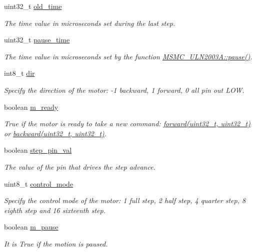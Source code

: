 \begin{DoxyCompactItemize}
uint32\+\_\+t \hyperlink{class_m_s_m_c___a4988_a60ff02342382a71526d14fb9e51ddc2a}{old\+\_\+time}
\begin{DoxyCompactList}\small\item\em The time value in microseconds set during the last step. \end{DoxyCompactList}\item 
uint32\+\_\+t \hyperlink{class_m_s_m_c___a4988_a3c4854c40c6d9db5e37698eea2debd70}{pause\+\_\+time}
\begin{DoxyCompactList}\small\item\em The time value in microseconds set by the function \hyperlink{class_m_s_m_c___u_l_n2003_a_aa1d3444465d59ca6c87f05f565dde4a2}{M\+S\+M\+C\+\_\+\+U\+L\+N2003\+A\+::pause()}. \end{DoxyCompactList}\item 
int8\+\_\+t \hyperlink{class_m_s_m_c___a4988_a887a3d29966bdfc0d920d339b83e5346}{dir}
\begin{DoxyCompactList}\small\item\em Specify the direction of the motor\+: -\/1 backward, 1 forward, 0 all pin out L\+O\+W. \end{DoxyCompactList}\item 
boolean \hyperlink{class_m_s_m_c___a4988_a86ef4c886ee6c7ed6fa87e27c0a7a9ea}{m\+\_\+ready}
\begin{DoxyCompactList}\small\item\em True if the motor is ready to take a new command\+: \hyperlink{class_m_s_m_c___a4988_a9acdbabf546656a6436e89579e8fcfca}{forward(uint32\+\_\+t, uint32\+\_\+t)} or \hyperlink{class_m_s_m_c___a4988_a836bed9e28e723ead2a94446bb704869}{backward(uint32\+\_\+t, uint32\+\_\+t)}. \end{DoxyCompactList}\item 
boolean \hyperlink{class_m_s_m_c___a4988_a1ec86b6286b8827eca6d5703a02f65fd}{step\+\_\+pin\+\_\+val}
\begin{DoxyCompactList}\small\item\em The value of the pin that drives the step advance. \end{DoxyCompactList}\item 
uint8\+\_\+t \hyperlink{class_m_s_m_c___a4988_a819ff8eed30ef364c710a1fb1371d18e}{control\+\_\+mode}
\begin{DoxyCompactList}\small\item\em Specify the control mode of the motor\+: 1 full step, 2 half step, 4 quarter step, 8 eighth step and 16 sixteenth step. \end{DoxyCompactList}\item 
boolean \hyperlink{class_m_s_m_c___a4988_a26b4b55d77fadf599d7208c0a1ce2383}{m\+\_\+pause}
\begin{DoxyCompactList}\small\item\em It is True if the motion is paused. \end{DoxyCompactList}\end{DoxyCompactItemize}


